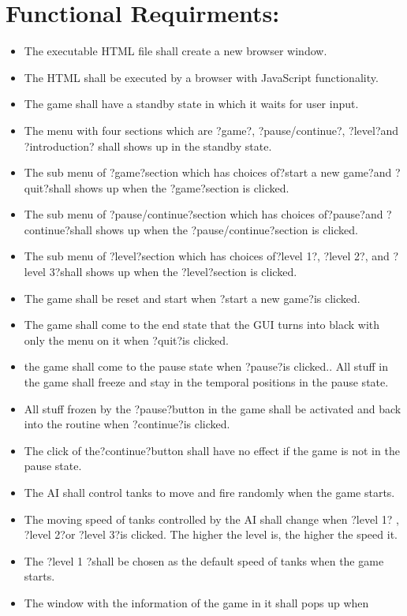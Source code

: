 \documentclass{article}
\begin{document}
\section {Functional Requirments:}
\begin{itemize}
\item The executable HTML file shall create a new browser window.
\item The HTML shall be executed by a browser with JavaScript functionality.
\item The game shall have a standby state in which it waits for user input.
\item The menu with four sections which are ?game?, ?pause/continue?, ?level?and
 ?introduction? shall shows up in the standby state.
\item The sub menu of ?game?section which has choices of?start a new game?and 
?quit?shall shows up when the ?game?section is clicked.
\item The sub menu of ?pause/continue?section which has choices of?pause?and 
?continue?shall shows up when the ?pause/continue?section is clicked.
\item The sub menu of ?level?section which has choices of?level 1?, ?level 2?,
 and ?level 3?shall shows up when the ?level?section is clicked.
\item The game shall be reset and start when ?start a new game?is clicked.
\item The game shall come to the end state that the GUI turns into black with 
only the menu on it when ?quit?is clicked.
\item the game shall come to the pause state when ?pause?is clicked.. All stuff 
in the game shall freeze and stay in the temporal positions in the pause state.
\item All stuff frozen by the ?pause?button in the game shall be activated and
 back into the routine when ?continue?is clicked.
\item The click of the?continue?button shall have no effect if the game is not
 in the pause state.
\item The AI shall control tanks to move and fire randomly when the game starts.
\item The moving speed of tanks controlled by the AI shall change when ?level 1?
, ?level 2?or ?level 3?is clicked. The higher the level is, the higher the speed
 it.
\item The ?level 1 ?shall be chosen as the default speed of tanks when the game 
starts.
\item The window with the information of the game in it shall pops up when 

\end{itemize}
\end{document}
